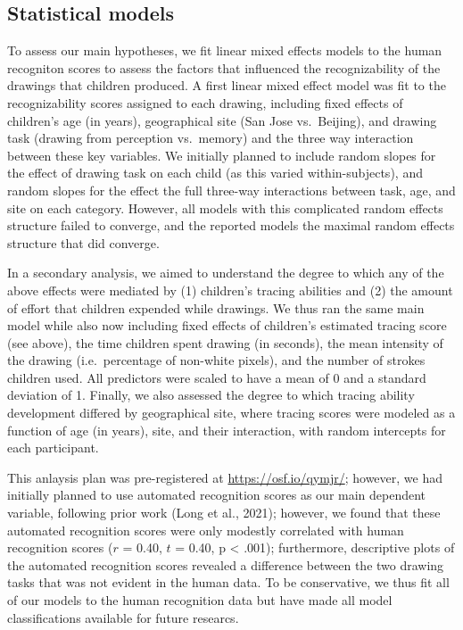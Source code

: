 \documentclass[
  english,
  man]{apa6}
\begin{document}
\hypertarget{statistical-models}{%
\subsection{Statistical models}\label{statistical-models}}

To assess our main hypotheses, we fit linear mixed effects models to the human recogniton scores to assess the factors that influenced the recognizability of the drawings that children produced. A first linear mixed effect model was fit to the recognizability scores assigned to each drawing, including fixed effects of children's age (in years), geographical site (San Jose vs.~Beijing), and drawing task (drawing from perception vs.~memory) and the three way interaction between these key variables. We initially planned to include random slopes for the effect of drawing task on each child (as this varied within-subjects), and random slopes for the effect the full three-way interactions between task, age, and site on each category. However, all models with this complicated random effects structure failed to converge, and the reported models the maximal random effects structure that did converge.

In a secondary analysis, we aimed to understand the degree to which any of the above effects were mediated by (1) children's tracing abilities and (2) the amount of effort that children expended while drawings. We thus ran the same main model while also now including fixed effects of children's estimated tracing score (see above), the time children spent drawing (in seconds), the mean intensity of the drawing (i.e.~percentage of non-white pixels), and the number of strokes children used. All predictors were scaled to have a mean of 0 and a standard deviation of 1. Finally, we also assessed the degree to which tracing ability development differed by geographical site, where tracing scores were modeled as a function of age (in years), site, and their interaction, with random intercepts for each participant.

This anlaysis plan was pre-registered at \url{https://osf.io/qymjr/}; however, we had initially planned to use automated recognition scores as our main dependent variable, following prior work (Long et al., 2021); however, we found that these automated recognition scores were only modestly correlated with human recognition scores (\(r\) = 0.40, \(t\) = 0.40, p \textless{} .001); furthermore, descriptive plots of the automated recognition scores revealed a difference between the two drawing tasks that was not evident in the human data. To be conservative, we thus fit all of our models to the human recognition data but have made all model classifications available for future researcs.
\end{document}

